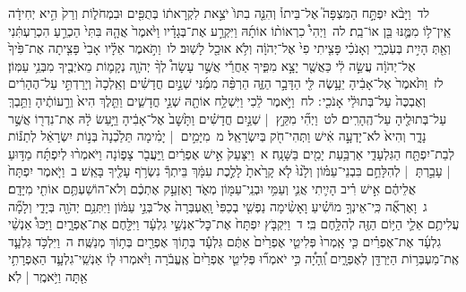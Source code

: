 \documentclass[18pt]{article}
\newcommand{\kri}[1]{\Afootnote{#1}}	%
\begin{document}
 {\loc לד~}וַיָּבֹ֨א יִפְתָּ֣ח הַמִּצְפָּה֮ אֶל־בֵּיתוֹ֒ וְהִנֵּ֤ה בִתּוֹ֙ יֹצֵ֣את לִקְרָאת֔וֹ בְּתֻפִּ֖ים וּבִמְחֹל֑וֹת וְרַק֙ הִ֣יא יְחִידָ֔ה אֵֽין־ל֥וֹ מִמֶּ֛נּוּ בֵּ֖ן אוֹ־בַֽת׃ \startlock
 {\loc לה~}וַיְהִי֩ כִרְאוֹת֨וֹ אוֹתָ֜הּ וַיִּקְרַ֣ע אֶת־בְּגָדָ֗יו וַיֹּ֙אמֶר֙ אֲהָ֤הּ בִּתִּי֙ הַכְרֵ֣עַ הִכְרַעְתִּ֔נִי וְאַ֖תְּ הָיִ֣ית בְּעֹֽכְרָ֑י וְאָנֹכִ֗י פָּצִ֤יתִי פִי֙ אֶל־יְהֹוָ֔ה וְלֹ֥א אוּכַ֖ל לָשֽׁוּב׃ \startlock
 {\loc לו~}וַתֹּ֣אמֶר אֵלָ֗יו אָבִי֙ פָּצִ֤יתָה אֶת־פִּ֙יךָ֙ אֶל־יְהֹוָ֔ה עֲשֵׂ֣ה לִ֔י כַּאֲשֶׁ֖ר יָצָ֣א מִפִּ֑יךָ אַחֲרֵ֡י אֲשֶׁ֣ר עָשָׂה֩ לְךָ֨ יְהֹוָ֧ה נְקָמ֛וֹת מֵאֹיְבֶ֖יךָ מִבְּנֵ֥י עַמּֽוֹן׃ \startlock
 {\loc לז~}וַתֹּ֙אמֶר֙ אֶל־אָבִ֔יהָ יֵעָ֥שֶׂה לִּ֖י הַדָּבָ֣ר הַזֶּ֑ה הַרְפֵּ֨ה מִמֶּ֜נִּי שְׁנַ֣יִם חֳדָשִׁ֗ים וְאֵֽלְכָה֙ וְיָרַדְתִּ֣י עַל־הֶהָרִ֔ים וְאֶבְכֶּה֙ עַל־בְּתוּלַ֔י אָנֹכִ֖י  \edtext{(ורעיתי)}{\kri{קרי: וְרֵֽעוֹתָֽי}} ׃ \startlock
 {\loc לח~}וַיֹּ֣אמֶר לֵ֔כִי וַיִּשְׁלַ֥ח אוֹתָ֖הּ שְׁנֵ֣י חֳדָשִׁ֑ים וַתֵּ֤לֶךְ הִיא֙ וְרֵ֣עוֹתֶ֔יהָ וַתֵּ֥בְךְּ עַל־בְּתוּלֶ֖יהָ עַל־הֶֽהָרִֽים׃ \startlock
 {\loc לט~}וַיְהִ֞י מִקֵּ֣ץ  |  שְׁנַ֣יִם חֳדָשִׁ֗ים וַתָּ֙שׇׁב֙ אֶל־אָבִ֔יהָ וַיַּ֣עַשׂ לָ֔הּ אֶת־נִדְר֖וֹ אֲשֶׁ֣ר נָדָ֑ר וְהִיא֙ לֹא־יָדְעָ֣ה אִ֔ישׁ וַתְּהִי־חֹ֖ק בְּיִשְׂרָאֵֽל׃ \startlock
 {\loc מ~}מִיָּמִ֣ים  |  יָמִ֗ימָה תֵּלַ֙כְנָה֙ בְּנ֣וֹת יִשְׂרָאֵ֔ל לְתַנּ֕וֹת לְבַת־יִפְתָּ֖ח הַגִּלְעָדִ֑י אַרְבַּ֥עַת יָמִ֖ים בַּשָּׁנָֽה׃ 
\startlock
 {\loc א~}וַיִּצָּעֵק֙ אִ֣ישׁ אֶפְרַ֔יִם וַֽיַּעֲבֹ֖ר צָפ֑וֹנָה וַיֹּאמְר֨וּ לְיִפְתָּ֜ח מַדּ֣וּעַ  |  עָבַ֣רְתָּ  |  לְהִלָּחֵ֣ם בִּבְנֵי־עַמּ֗וֹן וְלָ֙נוּ֙ לֹ֤א קָרָ֙אתָ֙ לָלֶ֣כֶת עִמָּ֔ךְ בֵּיתְךָ֕ נִשְׂרֹ֥ף עָלֶ֖יךָ בָּאֵֽשׁ׃ \startlock
 {\loc ב~}וַיֹּ֤אמֶר יִפְתָּח֙ אֲלֵיהֶ֔ם אִ֣ישׁ רִ֗יב הָיִ֛יתִי אֲנִ֛י וְעַמִּ֥י וּבְנֵֽי־עַמּ֖וֹן מְאֹ֑ד וָאֶזְעַ֣ק אֶתְכֶ֔ם וְלֹא־הוֹשַׁעְתֶּ֥ם אוֹתִ֖י מִיָּדָֽם׃ \startlock
 {\loc ג~}וָאֶרְאֶ֞ה כִּֽי־אֵינְךָ֣ מוֹשִׁ֗יעַ וָאָשִׂ֨ימָה נַפְשִׁ֤י בְכַפִּי֙ וָֽאֶעְבְּרָה֙ אֶל־בְּנֵ֣י עַמּ֔וֹן וַיִּתְּנֵ֥ם יְהֹוָ֖ה בְּיָדִ֑י וְלָמָ֞ה עֲלִיתֶ֥ם אֵלַ֛י הַיּ֥וֹם הַזֶּ֖ה לְהִלָּ֥חֶם בִּֽי׃ \startlock
 {\loc ד~}וַיִּקְבֹּ֤ץ יִפְתָּח֙ אֶת־כׇּל־אַנְשֵׁ֣י גִלְעָ֔ד וַיִּלָּ֖חֶם אֶת־אֶפְרָ֑יִם וַיַּכּוּ֩ אַנְשֵׁ֨י גִלְעָ֜ד אֶת־אֶפְרַ֗יִם כִּ֤י אָֽמְרוּ֙ פְּלִיטֵ֤י אֶפְרַ֙יִם֙ אַתֶּ֔ם גִּלְעָ֕ד בְּת֥וֹךְ אֶפְרַ֖יִם בְּת֥וֹךְ מְנַשֶּֽׁה׃ \startlock
 {\loc ה~}וַיִּלְכֹּ֥ד גִּלְעָ֛ד אֶֽת־מַעְבְּר֥וֹת הַיַּרְדֵּ֖ן לְאֶפְרָ֑יִם וְֽ֠הָיָ֠ה כִּ֣י יֹאמְר֞וּ פְּלִיטֵ֤י אֶפְרַ֙יִם֙ אֶֽעֱבֹ֔רָה וַיֹּ֨אמְרוּ ל֧וֹ אַנְשֵֽׁי־גִלְעָ֛ד הַאֶפְרָתִ֥י אַ֖תָּה וַיֹּ֥אמֶֽר  |  לֹֽא׃ \startlock
\end{document}
